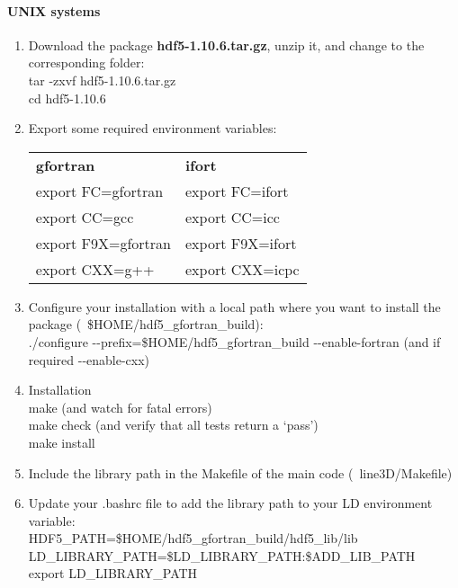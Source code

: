 \documentclass[10pt,a4paper]{article}
\begin{document}
\paragraph{UNIX systems}
\begin{enumerate}
\item Download the package \textbf{hdf5-1.10.6.tar.gz}, unzip it, and change to the corresponding folder: \\
  tar -zxvf hdf5-1.10.6.tar.gz\\
  cd hdf5-1.10.6
\item Export some required environment variables:\\
    \begin{tabular}{ll}
      \textbf{gfortran}  & \textbf{ifort} \\
      export FC=gfortran & export FC=ifort \\
      export CC=gcc & export CC=icc \\
      export F9X=gfortran & export F9X=ifort \\
      export CXX=g++ & export CXX=icpc
    \end{tabular}
\item Configure your installation with a local path where you want to install the package (\eg~\$HOME/hdf5\_gfortran\_build):\\
  ./configure -{}-prefix=\$HOME/hdf5\_gfortran\_build -{}-enable-fortran (and if required -{}-enable-cxx)
\item Installation \\
  make (and watch for fatal errors)\\
  make check   (and verify that all tests return a `pass') \\
  make install
\item Include the library path in the Makefile of the main code (\eg~line3D/Makefile)
\item Update your .bashrc file to add the library path to your LD environment variable:\\
    HDF5\_PATH=\$HOME/hdf5\_gfortran\_build/hdf5\_lib/lib \\
    LD\_LIBRARY\_PATH=\$LD\_LIBRARY\_PATH:\$ADD\_LIB\_PATH \\
    export LD\_LIBRARY\_PATH
\end{enumerate}
\end{document}
